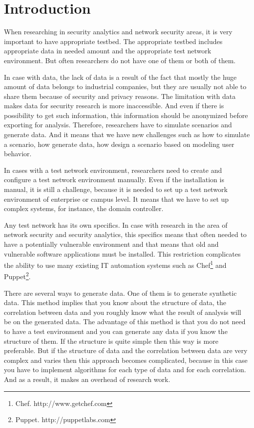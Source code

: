 \section{Introduction}


When researching in security analytics and network security areas, it is very important to have appropriate testbed. The appropriate testbed includes appropriate data in needed amount and the appropriate test network environment. But often researchers do not have one of them or both of them.  

In case with data, the lack of data is a result of the fact that mostly the huge amount of data belongs to industrial companies, but they are usually not able to share them because of security and privacy reasons. The limitation with data makes data for security research is more inaccessible. And even if there is possibility to get such information, this information should be anonymized before exporting for analysis. Therefore, researchers have to simulate scenarios and generate data. And it means that we have new challenges such as how to simulate a scenario, how generate data, how design a scenario based on modeling user behavior. 

In cases with a test network environment, researchers need to create and configure a test network environment manually. Even if the installation is manual, it is still a challenge, because it is needed to set up a test network environment of enterprise or campus level. It means that we have to set up complex systems, for instance, the domain controller. 

Any test network has its own specifics. In case with research in the area of network security and security analytics, this specifics means that often needed to have a potentially vulnerable environment and that means that old and vulnerable software applications must be installed. This restriction complicates the ability to use many existing IT automation systems such as Chef\footnote{Chef. http://www.getchef.com} and Puppet\footnote{Puppet. http://puppetlabs.com}. %

There are several ways to generate data. One of them is to generate synthetic data. This method implies that you know about the structure of data, the correlation between data and you roughly know what the result of analysis will be on the generated data. The advantage of this method is that you do not need to have a test environment and you can generate any data if you know the structure of them. If the structure is quite simple then this way is more preferable. But if the structure of data and the correlation between data are very complex and varies then this approach becomes complicated, because in this case you have to implement algorithms for each type of data and for each correlation. And as a result, it makes an overhead of research work.

